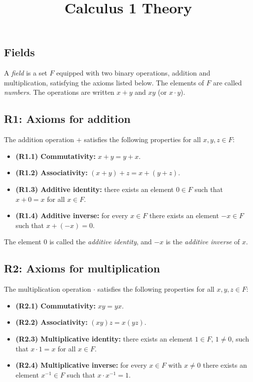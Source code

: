 \documentclass[11pt,a4paper]{article} \usepackage[T1]{fontenc}
\theoremstyle{plain} \newtheorem{theorem}{Theorem} \title{Calculus 1 Theory}
\begin{document}
\subsection*{Fields}

A \emph{field} is a set $F$ equipped with two binary operations, addition and
multiplication, satisfying the axioms listed below. The elements of $F$ are
called \emph{numbers}. The operations are written $x+y$ and $xy$ (or $x\cdot
y$).

\subsection*{R1: Axioms for addition}

The addition operation $+$ satisfies the following properties for all $x,y,z\in
F$:

\begin{itemize}
\item \textbf{(R1.1) Commutativity:} $x+y = y+x$.
\item \textbf{(R1.2) Associativity:} $(x+y)+z = x+(y+z)$.
\item \textbf{(R1.3) Additive identity:} there exists an element $0\in F$ such
that $x+0 = x$ for all $x\in F$.
\item \textbf{(R1.4) Additive inverse:} for every $x\in F$ there exists an
element $-x\in F$ such that $x+(-x)=0$.
\end{itemize}

The element $0$ is called the \emph{additive identity}, and $-x$ is the
\emph{additive inverse} of $x$.

\subsection*{R2: Axioms for multiplication}

The multiplication operation $\cdot$ satisfies the following properties for all
$x,y,z\in F$:

\begin{itemize}
\item \textbf{(R2.1) Commutativity:} $xy = yx$.
\item \textbf{(R2.2) Associativity:} $(xy)z = x(yz)$.
\item \textbf{(R2.3) Multiplicative identity:} there exists an element $1\in
F$, $1\neq 0$, such that $x\cdot 1 = x$ for all $x\in F$.
\item \textbf{(R2.4) Multiplicative inverse:} for every $x\in F$ with $x\neq 0$
there exists an element $x^{-1}\in F$ such that $x\cdot x^{-1} = 1$.
\end{itemize}
\end{document}
